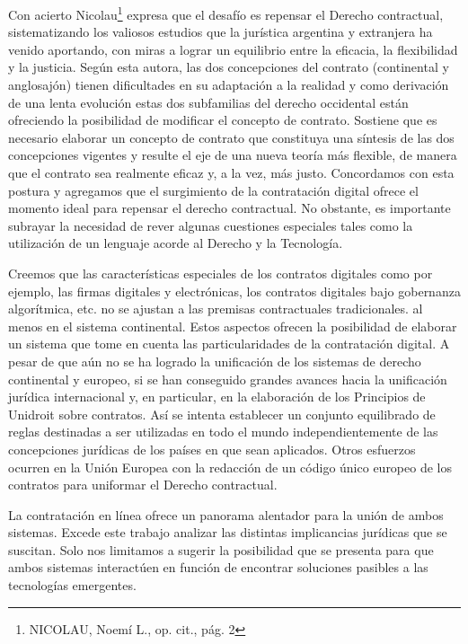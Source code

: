 \documentclass[12pt]{report} %
\begin{document}
Con acierto Nicolau\footnote{NICOLAU, Noemí L., op. cit., pág. 2}  expresa que el desafío es repensar el Derecho contractual, sistematizando los valiosos estudios que la jurística argentina y extranjera ha venido aportando, con miras a lograr un equilibrio entre la eficacia, la flexibilidad y la justicia. Según esta autora, las dos concepciones del contrato (continental y anglosajón) tienen dificultades en su adaptación a la realidad y como derivación de una lenta evolución estas dos subfamilias del derecho occidental están ofreciendo la posibilidad de modificar el concepto de contrato. Sostiene que es necesario elaborar un concepto de contrato que constituya una síntesis de las dos concepciones vigentes y resulte el eje de una nueva teoría más flexible, de manera que el contrato sea realmente eficaz y, a la vez, más justo. Concordamos con esta postura y agregamos que el surgimiento de la contratación digital ofrece el momento  ideal  para  repensar el  derecho contractual. No obstante, es importante subrayar la necesidad de rever  algunas cuestiones especiales  tales como la utilización de un lenguaje acorde al Derecho y la Tecnología.

Creemos que las características especiales de los contratos digitales como por ejemplo, las firmas digitales y electrónicas, los contratos digitales bajo gobernanza algorítmica, etc. no se ajustan a las premisas contractuales tradicionales. al menos en el sistema continental. Estos aspectos ofrecen la posibilidad de elaborar un sistema que tome en cuenta las particularidades de la contratación digital. A pesar de que aún no se ha logrado la unificación de los sistemas de derecho continental y europeo, si se han conseguido grandes avances hacia la unificación jurídica internacional y, en  particular, en la elaboración de los Principios de Unidroit sobre contratos. Así se intenta establecer un conjunto equilibrado de reglas destinadas a ser utilizadas en todo el mundo independientemente de las concepciones jurídicas de los países en que sean aplicados. Otros esfuerzos ocurren  en la Unión Europea con la redacción de un código único  europeo de los contratos para uniformar el Derecho contractual.  

La contratación en línea ofrece un panorama alentador para la unión de ambos sistemas. Excede este trabajo analizar las distintas implicancias jurídicas que se suscitan. Solo nos limitamos a sugerir la posibilidad que se presenta para que  ambos  sistemas interactúen en función de encontrar soluciones  pasibles  a las tecnologías emergentes.
\end{document}
